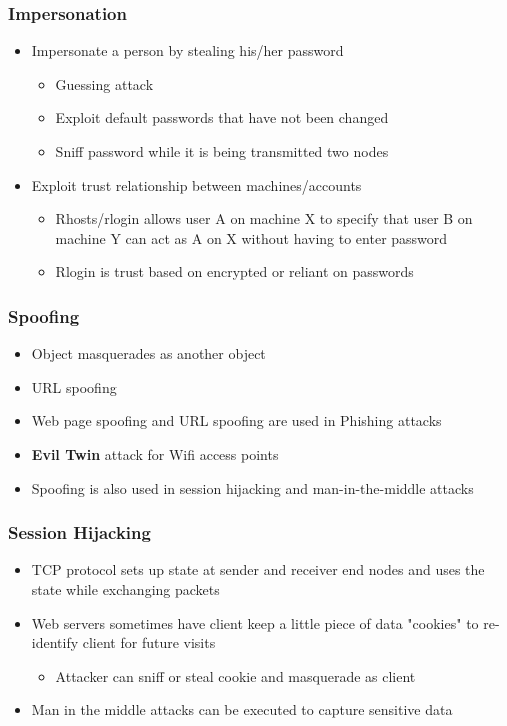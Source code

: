 \documentclass[twoside]{article}
\begin{document}
\subsubsection{Impersonation}
\begin{itemize}
\item Impersonate a person by stealing his/her password
\begin{itemize}
\item Guessing attack
\item Exploit default passwords that have not been changed
\item Sniff password while it is being transmitted two nodes
\end{itemize}
\item Exploit trust relationship between machines/accounts
\begin{itemize}
\item Rhosts/rlogin allows user A on machine X to specify that user B on machine Y can act as A on X without having to enter password
\item Rlogin is trust based on encrypted or reliant on passwords
\end{itemize}
\end{itemize}
\subsubsection{Spoofing}
\begin{itemize}
\item Object masquerades as another object
\item URL spoofing
\item Web page spoofing and URL spoofing are used in Phishing attacks 
\item \textbf{Evil Twin} attack for Wifi access points
\item Spoofing is also used in session hijacking and man-in-the-middle attacks
\end{itemize}

\subsubsection{Session Hijacking}
\begin{itemize}
\item TCP protocol sets up state at sender and receiver end nodes and uses the state while exchanging packets
\item Web servers sometimes have client keep a little piece of data "cookies" to re-identify client for future visits 
\begin{itemize}
\item Attacker can sniff or steal cookie and masquerade as client
\end{itemize}
\item Man in the middle attacks can be executed to capture sensitive data
\end{itemize}
\end{document}
